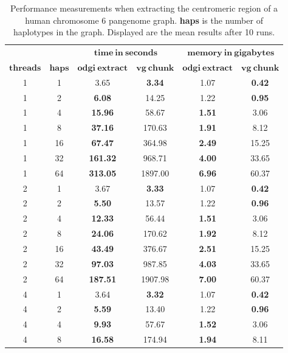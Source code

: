 \begin{table}[!ht]
	\centering
	\caption{\label{tab:extract} Performance measurements when extracting the centromeric region of a human chromosome 6 pangenome graph. \textbf{haps} is the number of haplotypes in the graph. Displayed are the mean results after 10 runs.}
	\begin{tabular}{@{}cccccc@{}}
		& & \multicolumn{2}{c}{$\mathbf{time\ in\ seconds}$} & \multicolumn{2}{c}{$\mathbf{memory\ in\ gigabytes}$} \\ \cmidrule(lr){3-4} \cmidrule(lr){5-6}
		{$\mathbf{threads}$} & {$\mathbf{haps}$} & {$\mathbf{odgi\ extract}$} & {$\mathbf{vg\ chunk}$} & {$\mathbf{odgi\ extract}$} & {$\mathbf{vg\ chunk}$} \\ \hline
		1 & 1 & 3.65 & \textbf{3.34} & 1.07 & \textbf{0.42} \\ 
		1 & 2 & \textbf{6.08} & 14.25 & 1.22 & \textbf{0.95} \\ 
		1 & 4 & \textbf{15.96} & 58.67 & \textbf{1.51} & 3.06 \\ 
		1 & 8 & \textbf{37.16} & 170.63 & \textbf{1.91} & 8.12 \\ 
		1 & 16 & \textbf{67.47} & 364.98 & \textbf{2.49} & 15.25 \\ 
		1 & 32 & \textbf{161.32} & 968.71 & \textbf{4.00} & 33.65 \\ 
		1 & 64 & \textbf{313.05} & 1897.00 & \textbf{6.96} & 60.37 \\ \midrule
		2 & 1 & 3.67 & \textbf{3.33} & 1.07 & \textbf{0.42} \\ 
		2 & 2 & \textbf{5.50} & 13.57 & 1.22 & \textbf{0.96} \\ 
		2 & 4 & \textbf{12.33} & 56.44 & \textbf{1.51} & 3.06 \\ 
		2 & 8 & \textbf{24.06} & 170.62 & \textbf{1.92} & 8.12 \\ 
		2 & 16 & \textbf{43.49} & 376.67 & \textbf{2.51} & 15.25 \\ 
		2 & 32 & \textbf{97.03} & 987.85 & \textbf{4.03} & 33.65 \\ 
		2 & 64 & \textbf{187.51} & 1907.98 & \textbf{7.00} & 60.37 \\ \midrule
		4 & 1 & 3.64 & \textbf{3.32} & 1.07 & \textbf{0.42} \\ 
		4 & 2 & \textbf{5.59} & 13.40 & 1.22 & \textbf{0.96} \\ 
		4 & 4 & \textbf{9.93} & 57.67 & \textbf{1.52} & 3.06 \\ 
		4 & 8 & \textbf{16.58} & 174.94 & \textbf{1.94} & 8.11 \\ 

\end{tabular}
\end{table}
